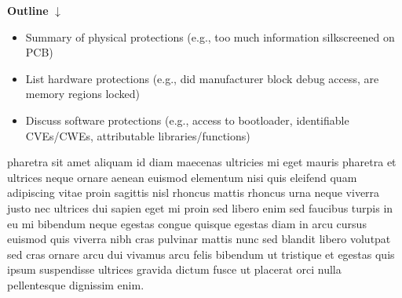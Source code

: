 \textbf{Outline}
$\downarrow$

\begin{itemize}
    \item Summary of physical protections (e.g., too much information silkscreened on PCB)
    \item List hardware protections (e.g., did manufacturer block debug access, are memory regions locked)
    \item Discuss software protections (e.g., access to bootloader, identifiable CVEs/CWEs, attributable libraries/functions)
\end{itemize}

pharetra sit amet aliquam id diam maecenas ultricies mi eget mauris pharetra et ultrices neque ornare aenean euismod elementum nisi quis eleifend quam adipiscing vitae proin sagittis nisl rhoncus mattis rhoncus urna neque viverra justo nec ultrices dui sapien eget mi proin sed libero enim sed faucibus turpis in eu mi bibendum neque egestas congue quisque egestas diam in arcu cursus euismod quis viverra nibh cras pulvinar mattis nunc sed blandit libero volutpat sed cras ornare arcu dui vivamus arcu felis bibendum ut tristique et egestas quis ipsum suspendisse ultrices gravida dictum fusce ut placerat orci nulla pellentesque dignissim enim.
